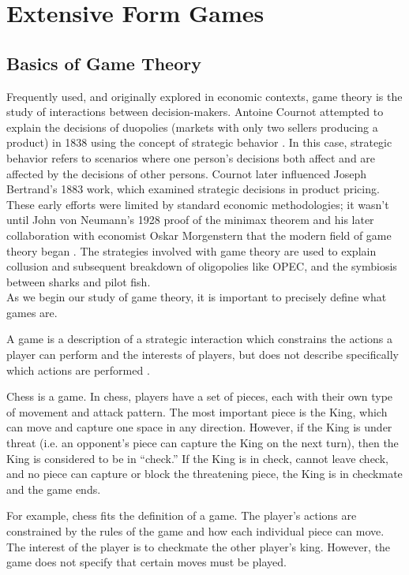 \chapter{Extensive Form Games}
\section{Basics of Game Theory}
Frequently used, and originally explored in economic contexts, game theory is the study of interactions between decision-makers. Antoine Cournot attempted to explain the decisions of duopolies (markets with only two sellers producing a product) in 1838 using the concept of strategic behavior \cite{webs14}. In this case, strategic behavior refers to scenarios where one person's decisions both affect and are affected by the decisions of other persons. Cournot later influenced Joseph Bertrand's 1883 work, which examined strategic decisions in product pricing. These early efforts were limited by standard economic methodologies; it wasn't until John von Neumann's 1928 proof of the minimax theorem and his later collaboration with economist Oskar Morgenstern that the modern field of game theory began \cite{webs14}. The strategies involved with game theory are used to explain collusion and subsequent breakdown of oligopolies like OPEC, and the symbiosis between sharks and pilot fish.\\

As we begin our study of game theory, it is important to precisely define what games are.
\begin{define}
  A game is a description of a strategic interaction which constrains the actions a player can perform and the interests of players, but does not describe specifically which actions are performed \cite{osbo94}.
\end{define}

\begin{exmp}
  Chess is a game. In chess, players have a set of pieces, each with their own type of movement and attack pattern. The most important piece is the King, which can move and capture one space in any direction. However, if the King is under threat (i.e. an opponent's piece can capture the King on the next turn), then the King is considered to be in ``check.'' If the King is in check, cannot leave check, and no piece can capture or block the threatening piece, the King is in checkmate and the game ends.
\end{exmp}

For example, chess fits the definition of a game. The player's actions are constrained by the rules of the game and how each individual piece can move. The interest of the player is to checkmate the other player's king. However, the game does not specify that certain moves must be played.

